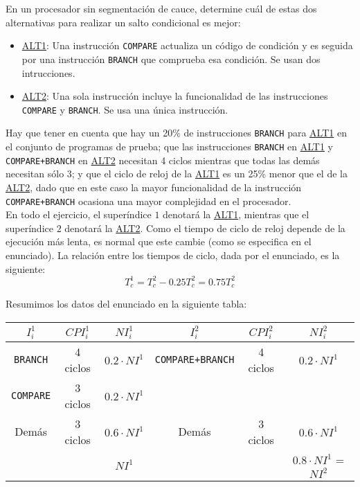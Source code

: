 \begin{ejercicio} \label{ej:1.3}
    En un procesador sin segmentación de cauce, determine cuál de estas dos alternativas para
    realizar un salto condicional es mejor:
    \begin{itemize}
        \item \ul{ALT1}: Una instrucción \verb|COMPARE| actualiza un código de condición y es seguida por una instrucción \verb|BRANCH| que comprueba esa condición. Se usan dos intrucciones.
        \item \ul{ALT2}: Una sola instrucción incluye la funcionalidad de las instrucciones \verb|COMPARE| y \verb|BRANCH|. Se usa una única instrucción.
    \end{itemize}

    Hay que tener en cuenta que hay un 20\% de instrucciones \verb|BRANCH| para \ul{ALT1}
    en el conjunto de programas de prueba; que las instrucciones \verb|BRANCH| en \ul{ALT1} y
    \verb|COMPARE+BRANCH| en \ul{ALT2} necesitan 4 ciclos mientras que todas las demás necesitan sólo 3;
    y que el ciclo de reloj de la \ul{ALT1} es un 25\% menor que el de la \ul{ALT2}, dado que en este caso
    la mayor funcionalidad de la instrucción \verb|COMPARE+BRANCH| ocasiona una mayor complejidad en el procesador.\\

    En todo el ejercicio, el superíndice $1$ denotará la \ul{ALT1}, mientras que
    el superíndice $2$ denotará la \ul{ALT2}.
    Como el tiempo de ciclo de reloj depende de la ejecución más lenta, es normal que este cambie (como se especifica en el enunciado).
    La relación entre los tiempos de ciclo, dada por el enunciado, es la siguiente:
    \begin{equation*}
        T_c^1 = T_c^2 - 0.25 T_c^2 = 0.75 T_c^2
    \end{equation*}

    Resumimos los datos del enunciado en la siguiente tabla:
    \begin{table}[H]
        \centering
        \begin{tabular}{c|c|c||c|c|c}
            $I_i^1$ & $CPI_i^1$ & $NI_i^1$ & $I_i^2$ & $CPI_i^2$ & $NI_i^2$ \\
            \hline
            \verb|BRANCH| & 4 ciclos & $0.2 \cdot NI^1$ & \verb|COMPARE+BRANCH| & 4 ciclos & $0.2 \cdot NI^1$ \\
            \verb|COMPARE| & 3 ciclos & $0.2 \cdot NI^1$ &  &  &  \\
            Demás & 3 ciclos & $0.6 \cdot NI^1$ & Demás & 3 ciclos & $0.6 \cdot NI^1$ \\
            \hline
            & & $NI^1$ &  &  & $0.8 \cdot NI^1$ = $NI^2$ \\
        \end{tabular}
    \end{table}


\end{ejercicio}
